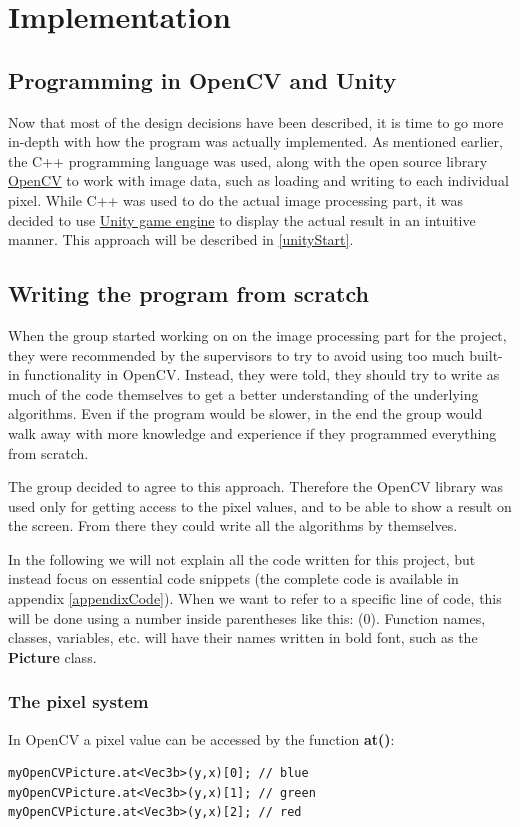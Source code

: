 \chapter{Implementation}

\section{Programming in OpenCV and Unity}
Now that most of the design decisions have been described, it is time to go more in-depth with how the program was actually implemented. As mentioned earlier, the C++ programming language was used, along with the open source library \href{http://opencv.org/}{OpenCV} to work with image data, such as loading and writing to each individual pixel. While C++ was used to do the actual image processing part, it was decided to use \href{http://unity3d.com/}{Unity game engine} to display the actual result in an intuitive manner. This approach will be described in \ref{unityStart}.

\section{Writing the program from scratch}
When the group started working on on the image processing part for the project, they were recommended by the supervisors to try to avoid using too much built-in functionality in OpenCV. Instead, they were told, they should try to write as much of the code themselves to get a better understanding of the underlying algorithms. Even if the program would be slower, in the end the group would walk away with more knowledge and experience if they programmed everything from scratch.

The group decided to agree to this approach. Therefore the OpenCV library was used only for getting access to the pixel values, and to be able to show a result on the screen. From there they could write all the algorithms by themselves.

In the following we will not explain all the code written for this project, but instead focus on essential code snippets (the complete code is available in appendix \ref{appendixCode}). When we want to refer to a specific line of code, this will be done using a number inside parentheses like this: (0). Function names, classes, variables, etc. will have their names written in bold font, such as the \textbf{Picture} class.

\subsection{The pixel system}
In OpenCV a pixel value can be accessed by the function \textbf{at()}:
\begin{lstlisting}
myOpenCVPicture.at<Vec3b>(y,x)[0]; // blue
myOpenCVPicture.at<Vec3b>(y,x)[1]; // green
myOpenCVPicture.at<Vec3b>(y,x)[2]; // red
\end{lstlisting}

